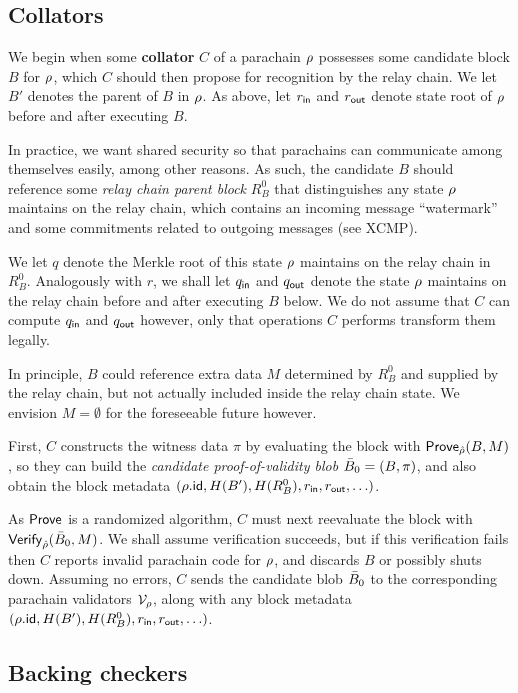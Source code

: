 \subsection{Collators} 
\label{sec:collators}

We begin when some {\bf collator} $C$ of a parachain $\rho$ possesses some candidate block $B$ for $\rho$, which $C$ should then propose for recognition by the relay chain.  We let $B'$ denotes the parent of $B$ in $\rho$.  As above, let $r_{\mathsf{in}}$ and $r_{\mathsf{out}}$ denote state root of $\rho$ before and after executing $B$.  

In practice, we want shared security so that parachains can communicate among themselves easily, among other reasons.  As such, the candidate $B$ should reference some {\em relay chain parent block} $R^0_B$ that distinguishes any state $\rho$ maintains on the relay chain, which contains an incoming message ``watermark'' and some commitments related to outgoing messages (see XCMP). 

We let $q$ denote the Merkle root of this state $\rho$ maintains on the relay chain in $R^0_B$.  Analogously with $r$, we shall let $q_{\mathsf{in}}$ and $q_{\mathsf{out}}$ denote the state $\rho$ maintains on the relay chain before and after executing $B$ below.  We do not assume that $C$ can compute $q_{\mathsf{in}}$ and $q_{\mathsf{out}}$ however, only that operations $C$ performs transform them legally.

In principle, $B$ could reference extra data $M$ determined by $R^0_B$ and supplied by the relay chain, but not actually included inside the relay chain state.  We envision $M = \emptyset$ for the foreseeable future however. 

First, $C$ constructs the witness data $\pi$ by evaluating the block with $\mathsf{Prove}_{\hat{\rho}}(B,M)$, so they can build the {\em candidate proof-of-validity blob} $\bar{B}_0 = (B,\pi)$, and also obtain the block metadata $(\rho.\mathsf{id},H(B'),H(R^0_B),r_{\mathsf{in}},r_{\mathsf{out}},\ldots)$.  

As $\mathsf{Prove}$ is a randomized algorithm, $C$ must next reevaluate the block with $\mathsf{Verify}_{\hat{\rho}}(\bar{B}_0,M)$.  We shall assume verification succeeds, but if this verification fails then $C$ reports invalid parachain code for $\rho$, and discards $B$ or possibly shuts down.  Assuming no errors, $C$ sends the candidate blob $\bar{B}_0$ to the corresponding parachain validators $\mathcal{V}_{\rho}$, along with any block metadata $(\rho.\mathsf{id},H(B'),H(R^0_B),r_{\mathsf{in}},r_{\mathsf{out}},\ldots)$. 


\subsection{Backing checkers} %
\label{sec:backing_checks}

